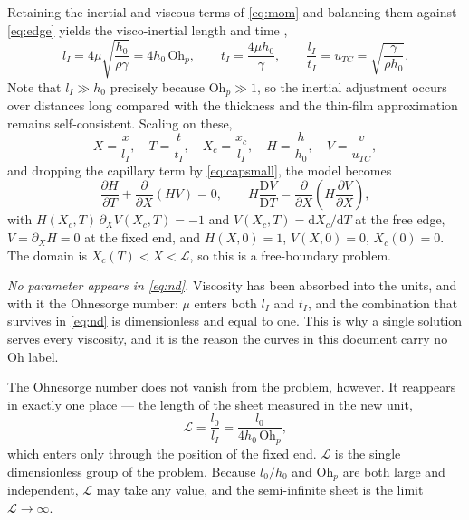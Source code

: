 \documentclass[11pt,a4paper]{article}
\newcommand{\Xc}{X_{c}}
\newcommand{\Ohp}{\mathrm{Oh}_{p}}
\begin{document}
Retaining the inertial and viscous terms of \eqref{eq:mom} and balancing them
against \eqref{eq:edge} yields the visco-inertial length and time
\cite{ahsan2025},
%
\begin{equation}
  l_{I} = 4\mu\sqrt{\frac{h_{0}}{\rho\gamma}} = 4 h_{0}\,\Ohp,
  \qquad
  t_{I} = \frac{4\mu h_{0}}{\gamma},
  \qquad
  \frac{l_{I}}{t_{I}} = u_{TC} = \sqrt{\frac{\gamma}{\rho h_{0}}} .
  \label{eq:scales}
\end{equation}
%
Note that $l_{I} \gg h_{0}$ precisely because $\Ohp \gg 1$, so the
inertial adjustment occurs over distances long compared with the thickness and
the thin-film approximation remains self-consistent. Scaling on these,
%
\begin{equation}
  X = \frac{x}{l_{I}}, \quad T = \frac{t}{t_{I}}, \quad
  \Xc = \frac{x_{c}}{l_{I}}, \quad H = \frac{h}{h_{0}}, \quad
  V = \frac{v}{u_{TC}},
  \label{eq:nondim}
\end{equation}
%
and dropping the capillary term by \eqref{eq:capsmall}, the model becomes
%
\begin{equation}
  \frac{\partial H}{\partial T} + \frac{\partial}{\partial X}(HV) = 0,
  \qquad
  H\frac{\mathrm{D}V}{\mathrm{D}T}
    = \frac{\partial}{\partial X}\left( H \frac{\partial V}{\partial X}\right),
  \label{eq:nd}
\end{equation}
%
with $H(\Xc,T)\,\partial_{X}V(\Xc,T) = -1$ and $V(\Xc,T) = \mathrm{d}\Xc/\mathrm{d}T$
at the free edge, $V = \partial_{X} H = 0$ at the fixed end, and
$H(X,0) = 1$, $V(X,0) = 0$, $\Xc(0) = 0$. The domain is
$\Xc(T) < X < \mathcal{L}$, so this is a free-boundary problem.

\emph{No parameter appears in \eqref{eq:nd}.} Viscosity has been absorbed into
the units, and with it the Ohnesorge number: $\mu$ enters both $l_{I}$ and
$t_{I}$, and the combination that survives in \eqref{eq:nd} is dimensionless
and equal to one. This is why a single solution serves every viscosity, and it
is the reason the curves in this document carry no $\mathrm{Oh}$ label.

The Ohnesorge number does not vanish from the problem, however. It reappears in
exactly one place --- the length of the sheet measured in the new unit,
%
\begin{equation}
  \mathcal{L} = \frac{l_{0}}{l_{I}} = \frac{l_{0}}{4 h_{0}\,\Ohp} ,
  \label{eq:Lgroup}
\end{equation}
%
which enters only through the position of the fixed end. $\mathcal{L}$ is the
single dimensionless group of the problem. Because $l_{0}/h_{0}$ and
$\Ohp$ are both large and independent, $\mathcal{L}$ may take any value,
and the semi-infinite sheet is the limit $\mathcal{L} \to \infty$.
\end{document}
